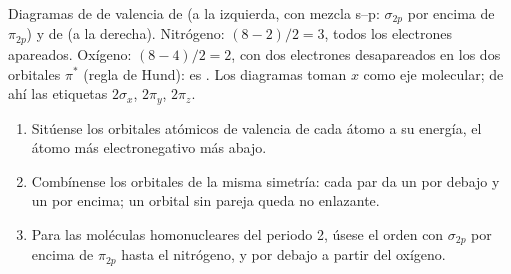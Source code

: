 \begin{omfigure}
\begin{MOdiagram}[names, labels, style=square, distance=4.2cm, labels-fs=\scriptsize]
\end{MOdiagram}
\hfill
\begin{MOdiagram}[names, labels, style=square, distance=4.2cm, labels-fs=\scriptsize]
\end{MOdiagram}

{\small Diagramas de  de valencia de  (a la izquierda, con mezcla s--p:
$\sigma_{2p}$ por encima de $\pi_{2p}$) y de  (a la derecha). Nitrógeno: 
$(8 - 2)/2 = 3$, todos los electrones apareados. Oxígeno:  $(8 - 4)/2 = 2$, con dos
electrones desapareados en los dos orbitales $\pi^*$ (regla de Hund):  es
. Los diagramas toman $x$ como eje molecular; de ahí las etiquetas
$2\sigma_x$, $2\pi_y$, $2\pi_z$.}
\end{omfigure}

\begin{method}\label{met:b2:diatomic-mos:build-diagram}
\begin{enumerate}
  \item Sitúense los orbitales atómicos de valencia de cada átomo a su energía, el átomo
        más electronegativo más abajo.
  \item Combínense los orbitales de la misma simetría: cada par da un 
        por debajo y un  por encima; un orbital sin pareja queda
        no enlazante.
  \item Para las moléculas homonucleares del periodo 2, úsese el orden con $\sigma_{2p}$ por encima de
        $\pi_{2p}$ hasta el nitrógeno, y por debajo a partir del oxígeno.
\end{enumerate}
\end{method}

